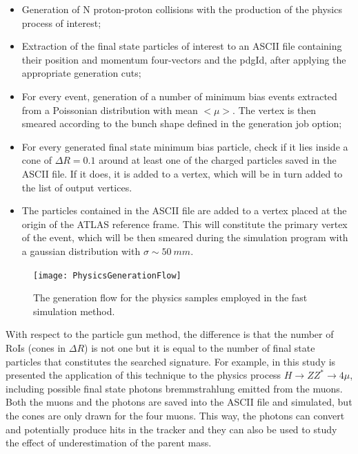 \documentclass[a4paper,twoside,12pt]{article}
\begin{document}
\begin{itemize}
\item Generation of N proton-proton collisions with the production of the physics process of
interest;
\item Extraction of the final state particles of interest to an ASCII file containing their
position and momentum four-vectors and the pdgId, after applying the appropriate generation cuts;
\item For every event, generation of a number of minimum bias events extracted from a Poissonian distribution with mean $<\mu>$. The vertex is then smeared according to the
bunch shape defined in the generation job option;
\item For every generated final state minimum bias particle, check if it lies inside a cone of 
$\Delta R = 0.1$ around at least one of the charged particles saved in the ASCII file. If it does,
it is added to a vertex, which will be in turn added to the list of output vertices.
\item The particles contained in the ASCII file are added to a vertex placed at the origin
of the ATLAS reference frame. This will constitute the primary vertex of the event, which
will be then smeared during the simulation program with a gaussian distribution with $\sigma \sim 50\ mm$.

\end{itemize}

\begin{figure} [h]
	\texttt{[image: PhysicsGenerationFlow]}
	\caption{The generation flow for the physics samples employed in the fast 
	simulation method. }
	\label{fig:PhysicsGenerationFlow}
\end{figure}

With respect to the particle gun method, the difference is that the number of RoIs (cones in
$\Delta R$) is not one but it is equal to the number of final state particles that constitutes the
searched signature. For example,
in this study is presented the application of this technique to the physics process
$H \rightarrow ZZ^* \rightarrow 4\mu$, including possible final state photons bremmstrahlung emitted from the muons. Both the muons and the photons are saved into the 
ASCII file and simulated, but the cones are only drawn for the four muons. This way, the photons can convert and potentially produce hits in the
tracker and they can also be used to study the effect of underestimation of the parent mass.\\
\end{document}
